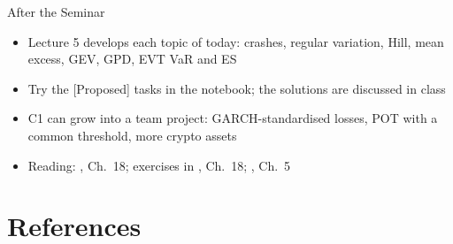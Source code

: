 \begin{frame}{After the Seminar}
\itemsize{\small}
\begin{itemize}
    \item Lecture 5 develops each topic of today: crashes, regular variation, Hill, mean excess, GEV, GPD, EVT VaR and ES
    \item Try the [Proposed] tasks in the notebook; the solutions are discussed in class
    \item C1 can grow into a team project: GARCH-standardised losses, POT with a common threshold, more crypto assets
    \item Reading: , Ch.~18; exercises in , Ch.~18; , Ch.~5
\end{itemize}
\end{frame}


\section{References}

